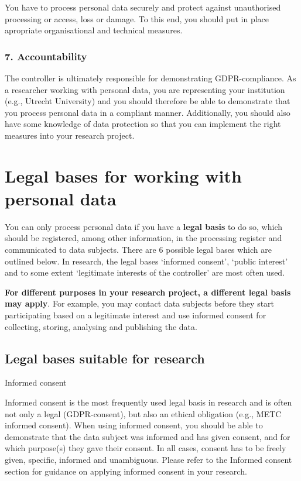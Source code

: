 \documentclass[
]{book}
\begin{document}
You have to process personal data securely and protect against unauthorised
processing or access, loss or damage. To this end, you should put in place
apropriate organisational and technical measures.

\hypertarget{accountability}{%
\subsubsection{7. Accountability}\label{accountability}}

The controller is ultimately responsible for demonstrating GDPR-compliance. As a
researcher working with personal data, you are representing your institution
(e.g., Utrecht University) and you should therefore be able to demonstrate that
you process personal data in a compliant manner. Additionally, you should also
have some knowledge of data protection so that you can implement the right
measures into your research project.

\hypertarget{legal-basis}{%
\section{Legal bases for working with personal data}\label{legal-basis}}

You can only process personal data if you have a \textbf{legal basis} to do so, which
should be registered, among other information, in the
processing register and
communicated to data subjects. There are 6 possible
legal bases which are outlined below. In research, the legal bases `informed
consent', `public interest' and to some extent `legitimate interests of the
controller' are most often used.

\textbf{For different purposes in your research project, a different
legal basis may apply}. For example, you may contact data subjects before they
start participating based on a legitimate interest and use informed consent for
collecting, storing, analysing and publishing the data.

\hypertarget{legal-bases-suitable-for-research}{%
\subsection{Legal bases suitable for research}\label{legal-bases-suitable-for-research}}

Informed consent

Informed consent is the most frequently used legal basis in research and
is often not only a legal (GDPR-consent), but also an ethical obligation
(e.g., METC informed consent). When using informed consent, you should
be able to demonstrate that the data subject was informed and has given
consent, and for which purpose(s) they gave their consent. In all cases,
consent has to be freely given, specific, informed and unambiguous. Please
refer to the Informed consent section
for guidance on applying informed consent in your research.
\end{document}
